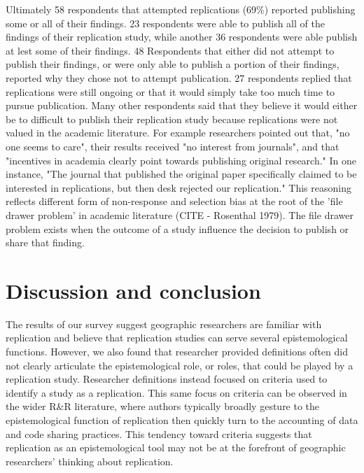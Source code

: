 \documentclass[]{interact}
\theoremstyle{plain}%
\theoremstyle{definition}
\theoremstyle{remark}
\begin{document}
Ultimately 58 respondents that attempted replications (69\%) reported publishing some or all of their findings.
23 respondents were able to publish all of the findings of their replication study, while another 36 respondents were able publish at lest some of their findings.
48 Respondents that either did not attempt to publish their findings, or were only able to publish a portion of their findings, reported why they chose not to attempt publication. 
27 respondents replied that replications were still ongoing or that it would simply take too much time to pursue publication. 
Many other respondents said that they believe it would either be to difficult to publish their replication study because replications were not valued in the academic literature.
For example researchers pointed out that, "no one seems to care", their results received "no interest from journals", and that "incentives in academia clearly point towards publishing original research."
In one instance, "The journal that published the original paper specifically claimed to be interested in replications, but then desk rejected our replication."
This reasoning reflects different form of non-response and selection bias at the root of the 'file drawer problem' in academic literature (CITE - Rosenthal 1979). 
The file drawer problem exists when the outcome of a study influence the decision to publish or share that finding. 

\section*{Discussion and conclusion}
The results of our survey suggest geographic researchers are familiar with replication and believe that replication studies can serve several epistemological functions.
However, we also found that researcher provided definitions often did not clearly articulate the epistemological role, or roles, that could be played by a replication study. 
Researcher definitions instead focused on criteria used to identify a study as a replication. 
This same focus on criteria can be observed in the wider R\&R literature, where authors typically broadly gesture to the epistemological function of replication then quickly turn to the accounting of data and code sharing practices. 
This tendency toward criteria suggests that replication as an epistemological tool may not be at the forefront of geographic researchers' thinking about replication.
\end{document}

